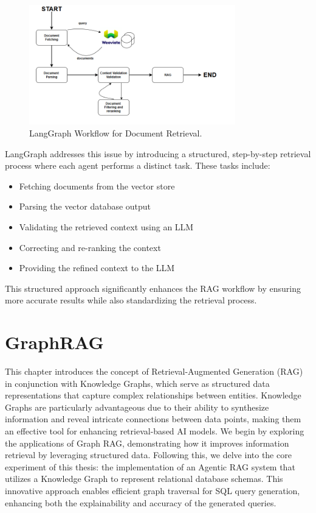 \begin{figure}[h]
    \centering
    \includegraphics[width=0.8\textwidth]{IMAGES/immagine_2025-03-22_165130054.png}
    \caption[LangGraph Workflow]{LangGraph Workflow for Document Retrieval.}
\end{figure}


LangGraph addresses this issue by introducing a structured, step-by-step retrieval process where each agent performs a distinct task. These tasks include:
\begin{itemize}
    \item Fetching documents from the vector store
    \item Parsing the vector database output
    \item Validating the retrieved context using an LLM
    \item Correcting and re-ranking the context
    \item Providing the refined context to the LLM
\end{itemize}
This structured approach significantly enhances the RAG workflow by ensuring more accurate results while also standardizing the retrieval process.

\chapter{GraphRAG}
This chapter introduces the concept of Retrieval-Augmented Generation (RAG) in conjunction with Knowledge Graphs, which serve as structured data representations that capture complex relationships between entities. Knowledge Graphs are particularly advantageous due to their ability to synthesize information and reveal intricate connections between data points, making them an effective tool for enhancing retrieval-based AI models. We begin by exploring the applications of Graph RAG, demonstrating how it improves information retrieval by leveraging structured data. Following this, we delve into the core experiment of this thesis: the implementation of an Agentic RAG system that utilizes a Knowledge Graph to represent relational database schemas. This innovative approach enables efficient graph traversal for SQL query generation, enhancing both the explainability and accuracy of the generated queries.


